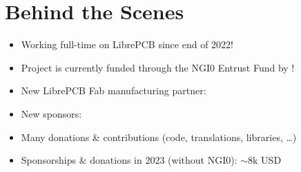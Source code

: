 \section{Behind the Scenes}

\begin{frame}{\secname}
  \begin{itemize}[<+->]
    \item Working full-time on LibrePCB since end of 2022!
    \item Project is currently funded through the NGI0 Entrust Fund by
          !
    \item New LibrePCB Fab manufacturing partner:
    \item New sponsors:
          \hspace{0.5mm}
          \hspace{0.5mm}
          \hspace{0.5mm}
          \hspace{0.5mm}
    \item Many donations \& contributions (code, translations, libraries, \ldots)
    \item Sponsorships \& donations in 2023 (without NGI0): $\sim$8k USD
  \end{itemize}


  \bigskip
  \bigskip
\end{frame}
